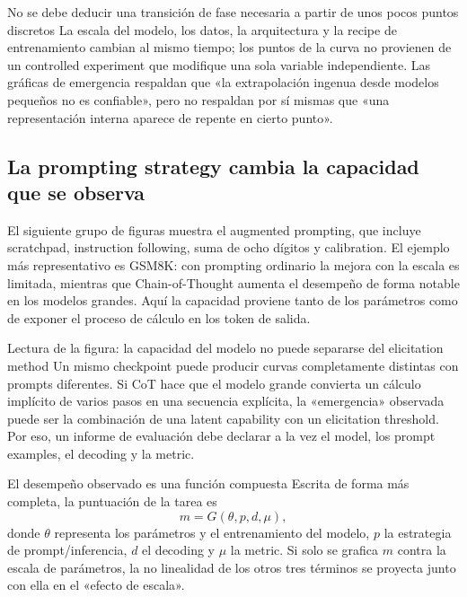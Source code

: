 \begin{warningbox}{No se debe deducir una transición de fase necesaria a partir de unos pocos puntos discretos}
La escala del modelo, los datos, la arquitectura y la recipe de entrenamiento cambian al mismo tiempo; los puntos de la curva no provienen de un controlled experiment que modifique una sola variable independiente. Las gráficas de emergencia respaldan que «la extrapolación ingenua desde modelos pequeños no es confiable», pero no respaldan por sí mismas que «una representación interna aparece de repente en cierto punto».
\end{warningbox}

\subsection{La prompting strategy cambia la capacidad que se observa}

El siguiente grupo de figuras muestra el augmented prompting, que incluye scratchpad, instruction following, suma de ocho dígitos y calibration. El ejemplo más representativo es GSM8K: con prompting ordinario la mejora con la escala es limitada, mientras que Chain-of-Thought aumenta el desempeño de forma notable en los modelos grandes. Aquí la capacidad proviene tanto de los parámetros como de exponer el proceso de cálculo en los token de salida.


\begin{knowledgebox}{Lectura de la figura: la capacidad del modelo no puede separarse del elicitation method}
Un mismo checkpoint puede producir curvas completamente distintas con prompts diferentes. Si CoT hace que el modelo grande convierta un cálculo implícito de varios pasos en una secuencia explícita, la «emergencia» observada puede ser la combinación de una latent capability con un elicitation threshold. Por eso, un informe de evaluación debe declarar a la vez el model, los prompt examples, el decoding y la metric.
\end{knowledgebox}

\begin{importantbox}{El desempeño observado es una función compuesta}
Escrita de forma más completa, la puntuación de la tarea es
\[
m=G(\theta, p, d, \mu),
\]
donde $\theta$ representa los parámetros y el entrenamiento del modelo, $p$ la estrategia de prompt/inferencia, $d$ el decoding y $\mu$ la metric. Si solo se grafica $m$ contra la escala de parámetros, la no linealidad de los otros tres términos se proyecta junto con ella en el «efecto de escala».
\end{importantbox}

